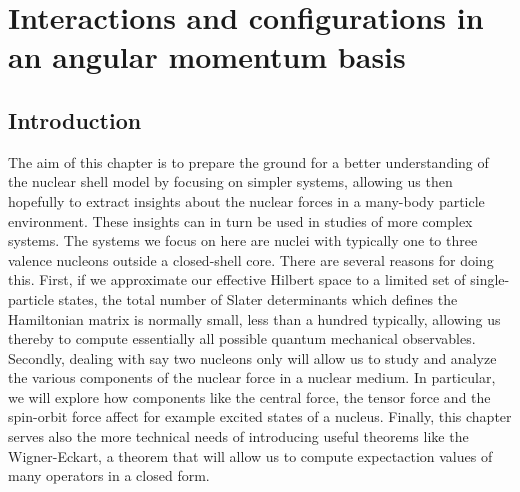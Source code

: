 
\chapter{Interactions and configurations in an angular momentum basis}

\section{Introduction}
The aim of this chapter is to prepare the ground for a better
understanding of the nuclear shell model by focusing on simpler
systems, allowing us then hopefully to extract insights about the
nuclear forces in a many-body particle environment. These insights can
in turn be used in studies of more complex systems.  The systems we
focus on here are nuclei with typically one to three valence nucleons
outside a closed-shell core.  There are several reasons for doing
this. First, if we approximate our effective Hilbert space to a
limited set of single-particle states, the total number of Slater
determinants which defines the Hamiltonian matrix is normally small,
less than a hundred typically, allowing us thereby to compute
essentially all possible quantum mechanical observables.  Secondly,
dealing with say two nucleons only will allow us to study and analyze
the various components of the nuclear force in a nuclear medium. In
particular, we will explore how components like the central force, the
tensor force and the spin-orbit force affect for example excited
states of a nucleus.  Finally, this chapter serves also the more
technical needs of introducing useful theorems like the Wigner-Eckart,
a theorem that will allow us to compute expectaction values of many
operators in a closed form.

